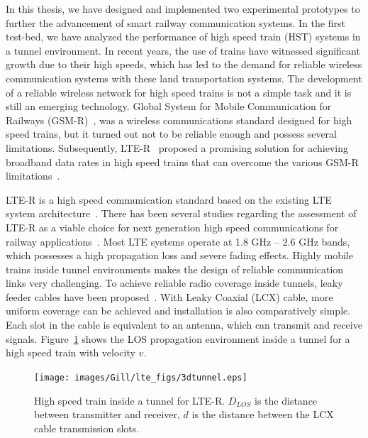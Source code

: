 In this thesis, we have designed and implemented two experimental prototypes to further the advancement of smart railway communication systems. In the first test-bed, we have analyzed the performance of high speed train (HST) systems in a tunnel environment. In recent years, the use of trains have witnessed significant growth due to their high speeds, which has led to the demand for reliable wireless communication systems with these land transportation systems. The development of a reliable wireless network for high speed trains is not a simple task and it is still an emerging technology. Global System for Mobile Communication for Railways (GSM-R)~\cite{trlter1}, was a wireless communications standard designed for high speed trains, but it turned out not to be reliable enough and possess several limitations. Subsequently, LTE-R~\cite{trlter2} proposed a promising solution for achieving broadband data rates in high speed trains that can overcome the various GSM-R limitations~\cite{arlter3,inplter4}. 

LTE-R is a high speed communication standard based on the existing LTE system architecture~\cite{inplter4}. There has been several studies regarding the assessment of LTE-R as a viable choice for next generation high speed communications for railway applications~\cite{inplter5,inplter6}. Most LTE systems operate at 1.8 GHz -- 2.6 GHz bands, which possesses a high propagation loss and severe fading effects. Highly mobile trains inside tunnel environments makes the design of reliable communication links very challenging. To achieve reliable radio coverage inside tunnels, leaky feeder cables have been proposed~\cite{arlter7}. With Leaky Coaxial (LCX) cable, more uniform coverage can be achieved and installation is also comparatively simple. Each slot in the cable is equivalent to an antenna, which can transmit and receive signals. Figure~\ref{fig:ltertunnel} shows the LOS propagation environment inside a tunnel for a high speed train with velocity $v$.
  
\begin{figure}[!ht]
\centering
\texttt{[image: images/Gill/lte\_figs/3dtunnel.eps]} 
\caption{High speed train inside a tunnel for LTE-R. $D_{LOS}$ is the distance between transmitter and receiver, $d$ is the distance between the LCX cable transmission slots.}
\label{fig:ltertunnel}
\end{figure}

